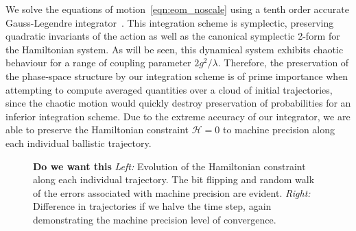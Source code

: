 We solve the equations of motion~\eqref{eqn:eom_noscale} using a tenth order accurate Gauss-Legendre integrator~\cite{Butcher,Braden}.
This integration scheme is symplectic, preserving quadratic invariants of the action as well as the canonical symplectic 2-form for the Hamiltonian system.
As will be seen, this dynamical system exhibits chaotic behaviour for a range of coupling parameter $2g^2/\lambda$.
Therefore, the preservation of the phase-space structure by our integration scheme is of prime importance when attempting to compute averaged quantities over a cloud of initial trajectories,
since the chaotic motion would quickly destroy preservation of probabilities for an inferior integration scheme.
Due to the extreme accuracy of our integrator, we are able to preserve the Hamiltonian constraint $\mathcal{H}=0$ to machine precision along each individual ballistic trajectory.
\begin{figure}
  \caption{{\bf Do we want this} \emph{Left:} Evolution of the Hamiltonian constraint along each individual trajectory.  The bit flipping and random walk of the errors associated with machine precision are evident. \emph{Right:} Difference in trajectories if we halve the time step, again demonstrating the machine precision level of convergence.}
\end{figure}



